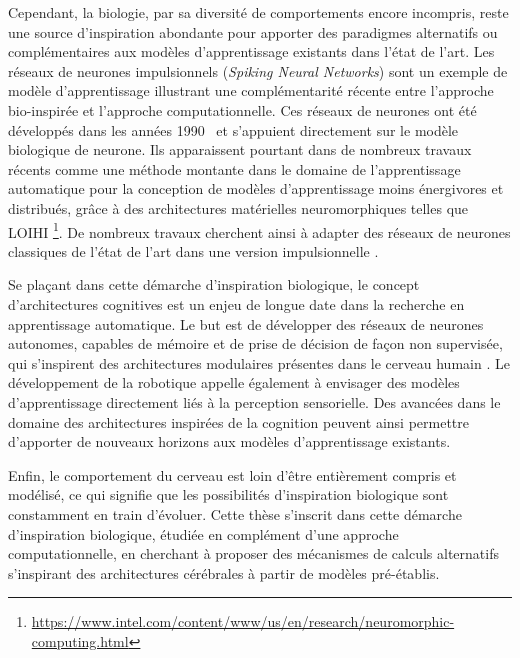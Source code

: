 Cependant, la biologie, par sa diversité de comportements encore incompris, reste une source d'inspiration abondante pour apporter des paradigmes alternatifs ou complémentaires aux modèles d'apprentissage existants dans l'état de l'art.
Les réseaux de neurones impulsionnels (\emph{Spiking Neural Networks}) sont un exemple de modèle d'apprentissage illustrant une complémentarité récente entre l'approche bio-inspirée et l'approche computationnelle.
Ces réseaux de neurones ont été développés dans les années 1990~\cite{Maass1996NetworksOS} et s'appuient directement sur le modèle biologique de neurone. %
Ils apparaissent pourtant dans de nombreux travaux récents comme une méthode montante dans le domaine de l'apprentissage automatique pour la conception de modèles d'apprentissage moins énergivores et distribués, grâce à des architectures matérielles neuromorphiques telles que LOIHI \footnote{\url{https://www.intel.com/content/www/us/en/research/neuromorphic-computing.html}}. De nombreux travaux cherchent ainsi à adapter des réseaux de neurones classiques de l'état de l'art dans une version impulsionnelle \cite{Schuman2022OpportunitiesFN}.

Se plaçant dans cette démarche d'inspiration biologique, le concept d'architectures cognitives est un enjeu de longue date dans la recherche en apprentissage automatique. Le but est de développer des réseaux de neurones autonomes, capables de mémoire et de prise de décision de façon non supervisée, qui s'inspirent des architectures modulaires présentes dans le cerveau humain \cite{Kotseruba201840YO}.
Le développement de la robotique appelle également à envisager des modèles d'apprentissage directement liés à la perception sensorielle.
Des avancées dans le domaine des architectures inspirées de la cognition peuvent ainsi permettre d'apporter de nouveaux horizons aux modèles d'apprentissage existants.

Enfin, le comportement du cerveau est loin d'être entièrement compris et modélisé, ce qui signifie que les possibilités d'inspiration biologique sont constamment en train d'évoluer.
Cette thèse s'inscrit dans cette démarche d'inspiration biologique, étudiée en complément d'une approche computationnelle, en cherchant à proposer des mécanismes de calculs alternatifs s'inspirant des architectures cérébrales à partir de modèles pré-établis.

